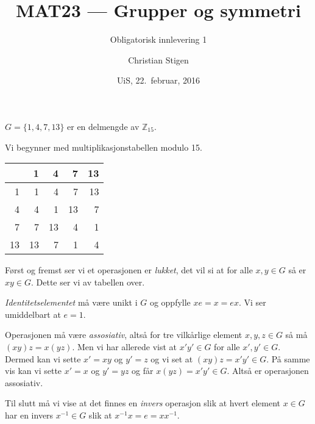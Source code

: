 \documentclass[a4paper,norsk,12pt]{article}
\title{MAT23   --- Grupper og symmetri}
\subtitle{Obligatorisk innlevering 1}
\author{Christian Stigen}
\date{UiS, 22.~februar, 2016}
\begin{document}
\maketitle

$G = \{ 1, 4, 7, 13 \}$ er en delmengde av $\mathbb{Z}_{15}$.


Vi begynner med multiplikasjonstabellen modulo 15.

\begin{table}[htp]
  \centering
  \begin{tabular}{r|rrrr}
       &  1 &  4 &  7 & 13 \\ \hline
     1 &  1 &  4 &  7 & 13 \\
     4 &  4 &  1 & 13 &  7 \\
     7 &  7 & 13 &  4 &  1 \\
    13 & 13 &  7 &  1 &  4 \\
  \end{tabular}
\end{table}

Først og fremst ser vi et operasjonen er \textit{lukket}, det vil si at for
alle $x,y \in G$ så er $xy \in G$. Dette ser vi av tabellen over.

\textit{Identitetselementet} må være unikt i $G$ og oppfylle $xe = x = ex$. Vi
ser umiddelbart at $e=1$.

Operasjonen må være \textit{assosiativ}, altså for tre vilkårlige element $x,y,z \in
G$ så må $(xy)z = x(yz)$. Men vi har allerede vist at $x'y' \in G$ for alle
$x', y' \in G$. Dermed kan vi sette $x'=xy$ og $y'=z$ og vi set at $(xy)z =
x'y' \in G$. På samme vis kan vi sette $x'=x$ og $y'=yz$ og får $x(yz) = x'y'
\in G$. Altså er operasjonen assosiativ.

Til slutt må vi vise at det finnes en \textit{invers} operasjon slik at hvert
element $x \in G$ har en invers $x^{-1} \in G$ slik at $x^{-1}x = e = xx^{-1}$.



\end{document}
